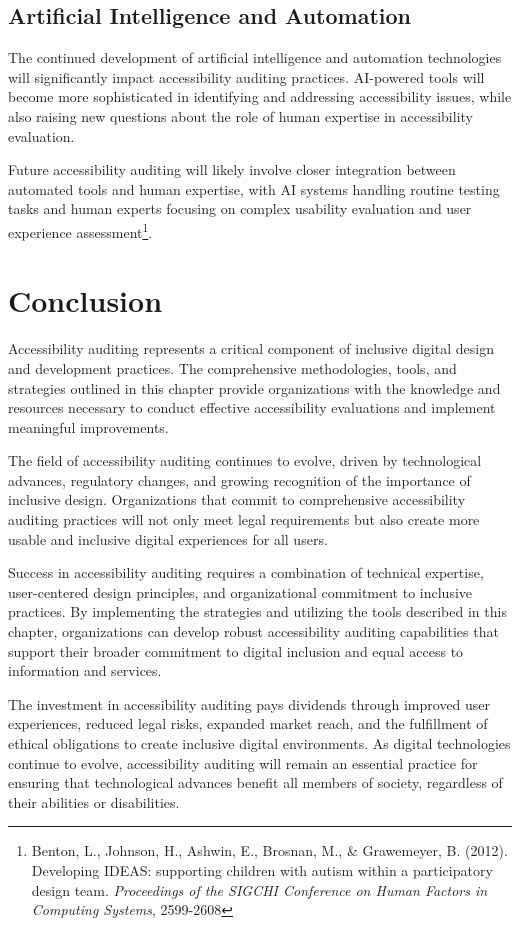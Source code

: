 \subsection{Artificial Intelligence and Automation}

The continued development of artificial intelligence and automation technologies will significantly impact accessibility auditing practices. AI-powered tools will become more sophisticated in identifying and addressing accessibility issues, while also raising new questions about the role of human expertise in accessibility evaluation.

Future accessibility auditing will likely involve closer integration between automated tools and human expertise, with AI systems handling routine testing tasks and human experts focusing on complex usability evaluation and user experience assessment\footnote{Benton, L., Johnson, H., Ashwin, E., Brosnan, M., \& Grawemeyer, B. (2012). Developing IDEAS: supporting children with autism within a participatory design team. \textit{Proceedings of the SIGCHI Conference on Human Factors in Computing Systems}, 2599-2608}.

\section{Conclusion}

Accessibility auditing represents a critical component of inclusive digital design and development practices. The comprehensive methodologies, tools, and strategies outlined in this chapter provide organizations with the knowledge and resources necessary to conduct effective accessibility evaluations and implement meaningful improvements.

The field of accessibility auditing continues to evolve, driven by technological advances, regulatory changes, and growing recognition of the importance of inclusive design. Organizations that commit to comprehensive accessibility auditing practices will not only meet legal requirements but also create more usable and inclusive digital experiences for all users.

Success in accessibility auditing requires a combination of technical expertise, user-centered design principles, and organizational commitment to inclusive practices. By implementing the strategies and utilizing the tools described in this chapter, organizations can develop robust accessibility auditing capabilities that support their broader commitment to digital inclusion and equal access to information and services.

The investment in accessibility auditing pays dividends through improved user experiences, reduced legal risks, expanded market reach, and the fulfillment of ethical obligations to create inclusive digital environments. As digital technologies continue to evolve, accessibility auditing will remain an essential practice for ensuring that technological advances benefit all members of society, regardless of their abilities or disabilities.
